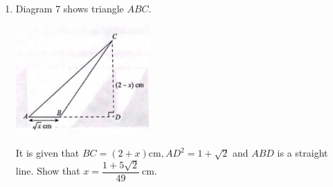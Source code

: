 \documentclass{report}
\begin{document}
\begin{enumerate}[leftmargin=*]
    \item Diagram 7 shows triangle $A B C$.
          \begin{center}
              \includegraphics[width=0.4\textwidth]{./assets/p1.11.png}
          \end{center}
          It is given that $B C=(2+x) \mathrm{cm}, A D^2=1+\sqrt{2}$ and $A B D$ is a straight line. Show that $x=\dfrac{1+5 \sqrt{2}}{49} \mathrm{~cm}$.


\end{enumerate}
\end{document}
